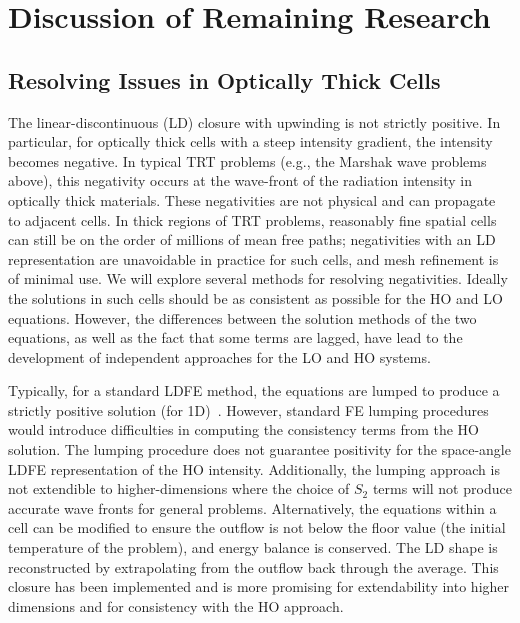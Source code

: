 \documentclass[11pt]{article}
\begin{document}
\section{Discussion of Remaining Research}
\label{sec:prop}

\subsection{Resolving Issues in Optically Thick Cells}
\label{sec:negs}

The linear-discontinuous (LD) closure with upwinding is not strictly positive.  In particular, for
optically thick cells with a steep intensity gradient, the intensity becomes
negative. In typical TRT problems (e.g., the Marshak wave problems above), this negativity occurs at the wave-front of the
radiation intensity in optically thick materials.
These negativities are not physical and can propagate to adjacent cells. In thick regions of
TRT problems, reasonably fine spatial cells can still be on the order of millions of mean
free paths; negativities with an LD representation are unavoidable in practice for
such cells, and mesh refinement is of minimal use.  We will explore several methods
for resolving negativities.  Ideally the solutions in
such cells should be as consistent as possible for the HO and LO equations.  However,
the differences between the solution methods of the two equations, as well as the
fact that some terms are lagged, have lead to the development of independent
approaches for the LO and HO systems.

Typically, for a standard LDFE method,
the equations are lumped to produce a strictly positive solution (for 1D)~\cite{morel_newton}. However, standard FE lumping
procedures would introduce difficulties in computing the consistency terms from the
HO solution.  The lumping procedure does not guarantee positivity for the space-angle LDFE
representation of the HO intensity.  Additionally, the lumping approach is not
extendible to higher-dimensions where the choice of $S_2$ terms will not produce
accurate wave fronts for general problems.
Alternatively, the equations within a cell can be modified to ensure the outflow is not
below the floor value (the initial temperature of the problem), and energy balance is
conserved.  The LD shape is reconstructed by extrapolating from the outflow back
through the average.  This closure has been implemented and is more promising for extendability into higher
dimensions and for consistency with the HO approach.
\end{document}

